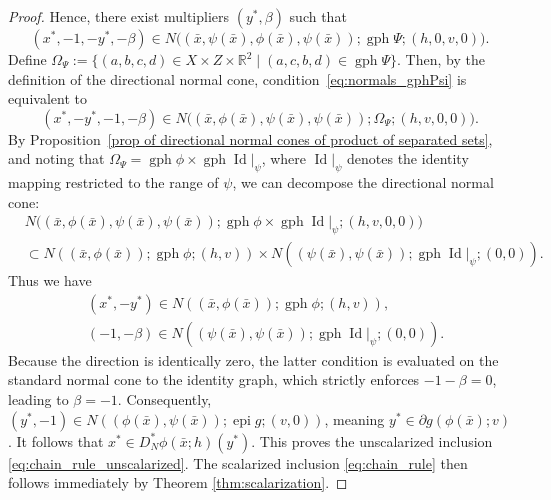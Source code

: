 \documentclass[10pt,a4paper]{amsart}
\begin{document}
\begin{proof}
Hence, there exist multipliers \( (y^*, \beta) \) such that
\begin{equation}\label{eq:normals_gphPsi}
    (x^*, -1, -y^*, -\beta)
    \in N\bigl((\bar{x}, \psi(\bar{x}), \phi(\bar{x}), \psi(\bar{x}));
               \operatorname{gph} \Psi; (h, 0, v, 0)\bigr).
\end{equation}
Define $\Omega_\Psi
    := \{ (a, b, c, d) \in X \times Z \times \mathbb{R}^2 
        \mid (a, c, b, d) \in \operatorname{gph} \Psi \}$. 
Then, by the definition of the directional normal cone, condition~\eqref{eq:normals_gphPsi} is equivalent to
\begin{equation}\label{eq:normals_omega}
    (x^*, -y^*, -1, -\beta)
    \in N\bigl((\bar{x}, \phi(\bar{x}), \psi(\bar{x}), \psi(\bar{x}));
               \Omega_\Psi; (h, v, 0, 0)\bigr).
\end{equation}
By Proposition~\ref{prop of directional normal cones of product of separated sets},  
and noting that $\Omega_\Psi = \operatorname{gph} \phi \times \operatorname{gph} \operatorname{Id}|_{\psi}$, 
where \( \operatorname{Id}|_{\psi} \) denotes the identity mapping restricted to the range of \( \psi \),  
we can decompose the directional normal cone:
\begin{equation}\label{eq:decomposition of normal cone in chain rule}
    \begin{aligned}
    &N\bigl((\bar{x}, \phi(\bar{x}), \psi(\bar{x}), \psi(\bar{x}));
        \operatorname{gph} \phi \times 
        \operatorname{gph} \operatorname{Id}|_{\psi}; 
        (h, v, 0, 0)\bigr) \\
    &\subset
    N((\bar{x}, \phi(\bar{x})); \operatorname{gph} \phi; (h, v))
    \times
    N((\psi(\bar{x}), \psi(\bar{x})); 
      \operatorname{gph} \operatorname{Id}|_{\psi}; (0, 0)).
    \end{aligned}
\end{equation}
Thus we have
\begin{equation}
    \begin{split}
        &(x^*, -y^*) \in N((\bar{x}, \phi(\bar{x})); \operatorname{gph} \phi; (h, v)),\\
&(-1, -\beta) \in 
N((\psi(\bar{x}), \psi(\bar{x})); 
  \operatorname{gph} \operatorname{Id}|_{\psi}; (0, 0)). 
    \end{split}
\end{equation}
Because the direction is identically zero, the latter condition is evaluated on the standard normal cone to the identity graph, which strictly enforces $-1 - \beta = 0$, leading to \( \beta = -1 \).  
Consequently, $(y^*, -1) \in N((\phi(\bar{x}), \psi(\bar{x})); \operatorname{epi} g; (v, 0))$, meaning \( y^* \in \partial g(\phi(\bar{x}); v) \). It follows that $x^* \in D^*_N \phi(\bar{x}; h)(y^*)$. 
This proves the unscalarized inclusion \eqref{eq:chain_rule_unscalarized}. 
The scalarized inclusion \eqref{eq:chain_rule} then follows immediately by Theorem \ref{thm:scalarization}. 
\end{proof}
\end{document}
